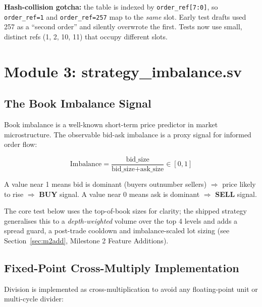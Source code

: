 \documentclass[11pt,a4paper]{article}
\begin{document}
\noindent\textbf{Hash-collision gotcha:} the table is indexed by
\texttt{order\_ref[7:0]}, so \texttt{order\_ref=1} and \texttt{order\_ref=257}
map to the \emph{same} slot. Early test drafts used 257 as a ``second order''
and silently overwrote the first. Tests now use small, distinct refs
(1, 2, 10, 11) that occupy different slots.

\section{Module 3: strategy\_imbalance.sv}

\subsection{The Book Imbalance Signal}

Book imbalance is a well-known short-term price predictor in market microstructure.
The observable bid-ask imbalance is a proxy signal for informed order flow:

\[
\text{Imbalance} = \frac{\text{bid\_size}}{\text{bid\_size} + \text{ask\_size}}
\in [0, 1]
\]

A value near 1 means bid is dominant (buyers outnumber sellers)
$\Rightarrow$ price likely to rise $\Rightarrow$ \textbf{BUY} signal.
A value near 0 means ask is dominant $\Rightarrow$ \textbf{SELL} signal.

\noindent The core test below uses the top-of-book sizes for clarity; the shipped
strategy generalises this to a \emph{depth-weighted} volume over the top 4 levels
and adds a spread guard, a post-trade cooldown and imbalance-scaled lot sizing
(see Section~\ref{sec:m2add}, Milestone 2 Feature Additions).

\subsection{Fixed-Point Cross-Multiply Implementation}

Division is implemented as cross-multiplication to avoid any floating-point unit
or multi-cycle divider:
\end{document}
